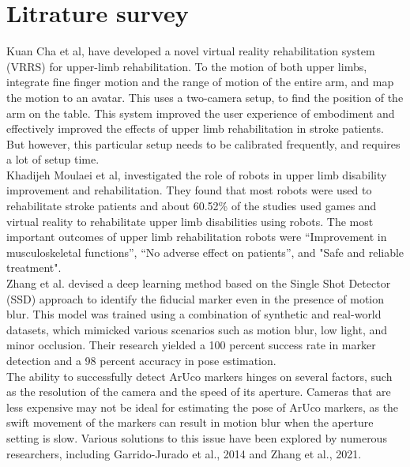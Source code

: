 \documentclass[12pt, twoside]{report}
\begin{document}
\chapter{Litrature survey}

Kuan Cha et al, have developed a novel virtual reality rehabilitation 
system (VRRS) for upper-limb rehabilitation. To the motion of both upper 
limbs, integrate fine finger motion and the range of motion of the entire 
arm, and map the motion to an avatar. This uses a two-camera setup, 
to find the position of the arm on the table. This system improved 
the user experience of embodiment and effectively improved the effects 
of upper limb rehabilitation in stroke patients. But however, 
this particular setup needs to be calibrated frequently, and requires a 
lot of setup time.\\

Khadijeh Moulaei et al, investigated the role of robots in upper limb 
disability improvement and rehabilitation. They found that most robots 
were used to rehabilitate stroke patients and about 60.52{\%} of the studies 
used games and virtual reality to rehabilitate upper limb disabilities using 
robots. The most important outcomes of upper limb rehabilitation robots 
were “Improvement in musculoskeletal functions”, “No adverse effect on
 patients”, and "Safe and reliable treatment". \\

Zhang et al. devised a deep learning method based on the Single Shot 
Detector (SSD) approach to identify the fiducial marker even in the 
presence of motion blur. This model was trained using a combination 
of synthetic and real-world datasets, which mimicked various scenarios 
such as motion blur, low light, and minor occlusion. 
Their research yielded a 100 percent success rate in marker detection 
and a 98 percent accuracy in pose estimation. \\

The ability to successfully detect ArUco markers hinges on several factors, 
such as the resolution of the camera and the speed of its aperture. 
Cameras that are less expensive may not be ideal for estimating the 
pose of ArUco markers, as the swift movement of the markers can result 
in motion blur when the aperture setting is slow. Various solutions to 
this issue have been explored by numerous researchers, 
including Garrido-Jurado et al., 2014 and Zhang et al., 2021. \\
\end{document}
